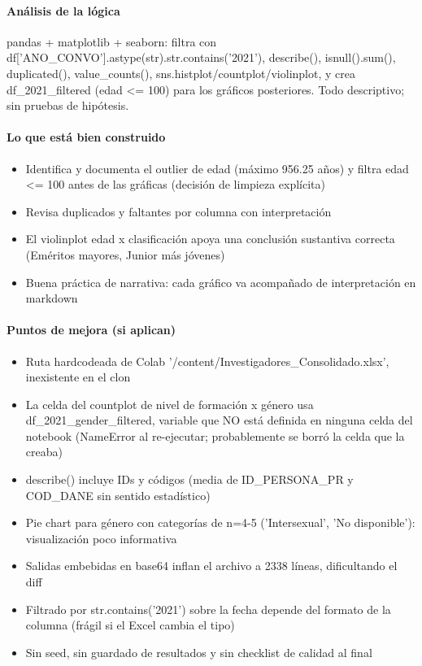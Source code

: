 \paragraph{Análisis de la lógica}
pandas + matplotlib + seaborn: filtra con df['ANO\_CONVO'].astype(str).str.contains('2021'), describe(), isnull().sum(), duplicated(), value\_counts(), sns.histplot/countplot/violinplot, y crea df\_2021\_filtered (edad <= 100) para los gráficos posteriores. Todo descriptivo; sin pruebas de hipótesis.

\paragraph{Lo que está bien construido}
\begin{itemize}
  \item Identifica y documenta el outlier de edad (máximo 956.25 años) y filtra edad <= 100 antes de las gráficas (decisión de limpieza explícita)
  \item Revisa duplicados y faltantes por columna con interpretación
  \item El violinplot edad x clasificación apoya una conclusión sustantiva correcta (Eméritos mayores, Junior más jóvenes)
  \item Buena práctica de narrativa: cada gráfico va acompañado de interpretación en markdown
\end{itemize}

\paragraph{Puntos de mejora (si aplican)}
\begin{itemize}
  \item Ruta hardcodeada de Colab '/content/Investigadores\_Consolidado.xlsx', inexistente en el clon
  \item La celda del countplot de nivel de formación x género usa df\_2021\_gender\_filtered, variable que NO está definida en ninguna celda del notebook (NameError al re-ejecutar; probablemente se borró la celda que la creaba)
  \item describe() incluye IDs y códigos (media de ID\_PERSONA\_PR y COD\_DANE sin sentido estadístico)
  \item Pie chart para género con categorías de n=4-5 ('Intersexual', 'No disponible'): visualización poco informativa
  \item Salidas embebidas en base64 inflan el archivo a 2338 líneas, dificultando el diff
  \item Filtrado por str.contains('2021') sobre la fecha depende del formato de la columna (frágil si el Excel cambia el tipo)
  \item Sin seed, sin guardado de resultados y sin checklist de calidad al final
\end{itemize}


